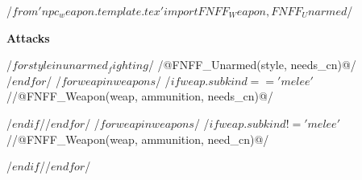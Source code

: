 \raggedright
/$from 'npc_weapon.template.tex' import FNFF_Weapon, FNFF_Unarmed $/
\vspace*{8pt}
\centerline{\textbf{Attacks}}
\vspace*{-6pt}
/$ for style in unarmed_fighting $/
/@FNFF_Unarmed(style, needs_cn)@/\\/$ endfor $/
/$ for weap in weapons $/
/$if weap.subkind == 'melee'$//@FNFF_Weapon(weap, ammunition, needs_cn)@/

/$endif$//$ endfor $/
/$ for weap in weapons $/
/$if weap.subkind != 'melee'$//@FNFF_Weapon(weap, ammunition, need_cn)@/

/$endif$//$ endfor $/
\justifying
\vfill\null
